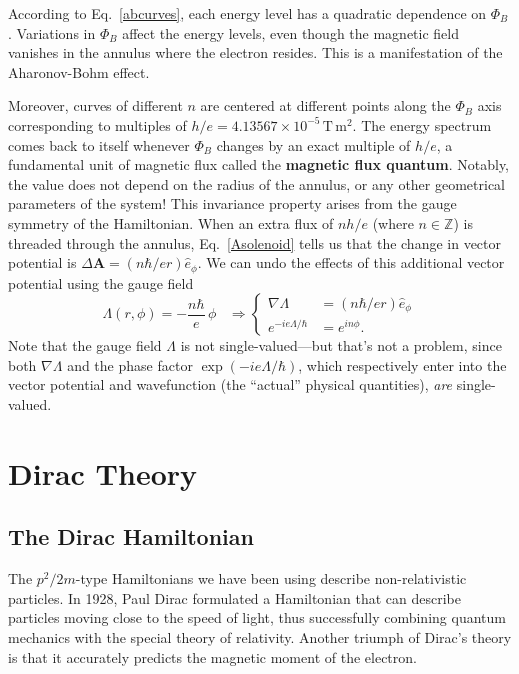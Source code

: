\documentclass[pra,12pt]{revtex4}
\begin{document}
According to Eq.~\eqref{abcurves}, each energy level has a quadratic
dependence on $\Phi_B$.  Variations in $\Phi_B$ affect the energy
levels, even though the magnetic field vanishes in the annulus where
the electron resides.  This is a manifestation of the Aharonov-Bohm
effect.

Moreover, curves of different $n$ are centered at different points
along the $\Phi_B$ axis corresponding to multiples of $h/e =
4.13567\times10^{-5}\,\mathrm{T}\,\mathrm{m}^2$.  The energy spectrum
comes back to itself whenever $\Phi_B$ changes by an exact multiple of
$h/e$, a fundamental unit of magnetic flux called the \textbf{magnetic
  flux quantum}.  Notably, the value does not depend on the radius of
the annulus, or any other geometrical parameters of the system!  This
invariance property arises from the gauge symmetry of the Hamiltonian.
When an extra flux of $nh/e$ (where $n\in\mathbb{Z}$) is threaded
through the annulus, Eq.~\eqref{Asolenoid} tells us that the change in
vector potential is $\Delta \mathbf{A} = (n\hbar/ e r) \hat{e}_\phi$.
We can undo the effects of this additional vector potential using the
gauge field
\begin{equation}
  \Lambda(r,\phi) = - \frac{n\hbar}{e} \, \phi \;\;\;\Rightarrow
  \begin{cases}\nabla \Lambda &= \displaystyle (n\hbar/er) \hat{e}_\phi
    \\ \displaystyle e^{-ie\Lambda/\hbar} &= \displaystyle e^{in\phi}.
  \end{cases}
\end{equation}
Note that the gauge field $\Lambda$ is not single-valued---but that's
not a problem, since both $\nabla\Lambda$ and the phase factor
$\exp(-ie\Lambda/\hbar)$, which respectively enter into the vector
potential and wavefunction (the ``actual'' physical quantities),
\textit{are} single-valued.

\section{Dirac Theory}

\subsection{The Dirac Hamiltonian}
\label{sec:DiracH}

The $p^2/2m$-type Hamiltonians we have been using describe
non-relativistic particles.  In 1928, Paul Dirac formulated a
Hamiltonian that can describe particles moving close to the speed of
light, thus successfully combining quantum mechanics with the special
theory of relativity. Another triumph of Dirac's theory is that it
accurately predicts the magnetic moment of the electron.
\end{document}

